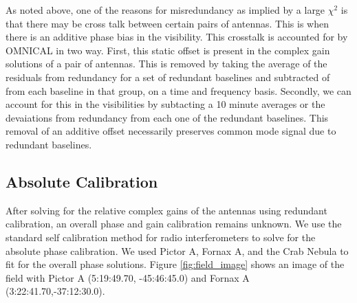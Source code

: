 \documentclass[twocolumn,numberedappendix]{emulateapj} \shorttitle{PSA64}
\begin{document}
As noted above, one of the reasons for misredundancy as implied by a large $\chi^{2}$ is that there may be cross talk between certain pairs of antennas. This is when there is an additive phase bias in the visibility. This crosstalk is accounted for by OMNICAL in two way. First, this static offset is present in the complex gain solutions of a pair of antennas. This is removed by taking the average of the residuals from redundancy for a set of redundant baselines and subtracted of from each baseline in that group, on a time and frequency basis. 
Secondly, we can account for this in the visibilities by subtacting a 10 minute averages or the devaiations from redundancy from each one of the redundant baselines. This removal of an additive offset necessarily preserves common mode signal due to redundant baselines.

\subsection{Absolute Calibration} 
%

After solving for the relative complex gains of the antennas using redundant
calibration, an overall phase and gain calibration remains unknown. We use the
standard self calibration method for radio interferometers to solve for the
absolute phase calibration. We used Pictor A, Fornax A, and the Crab Nebula to
fit for the overall phase solutions. Figure \ref{fig:field_image} shows an image
of the field with Pictor A (5:19:49.70, -45:46:45.0)  and Fornax A
(3:22:41.70,-37:12:30.0).
\end{document}
